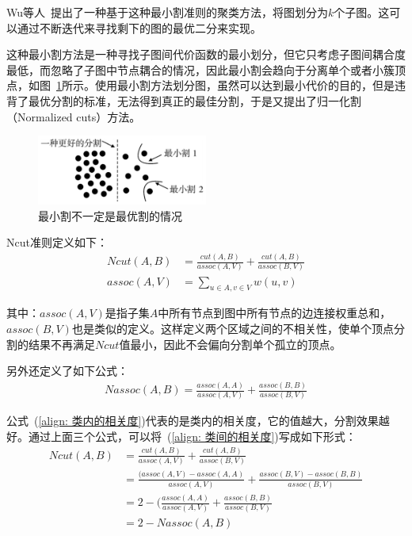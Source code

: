 \documentclass[12pt]{article}
\begin{document}
Wu等人~\cite{wu1993optimal}提出了一种基于这种最小割准则的聚类方法，将图划分为$k$个子图。这可以通过不断迭代来寻找剩下的图的最优二分来实现。

这种最小割方法是一种寻找子图间代价函数的最小划分，但它只考虑子图间耦合度最低，而忽略了子图中节点耦合的情况，因此最小割会趋向于分离单个或者小簇顶点，如图~\ref{fig: minCuts}所示。使用最小割方法划分图，虽然可以达到最小代价的目的，但是违背了最优分割的标准，无法得到真正的最佳分割，于是又提出了归一化割（Normalized cuts）方法。

\begin{figure}[!ht]
\centering
\includegraphics[width=0.5\textwidth]{minCuts.png}
\caption{最小割不一定是最优割的情况}
\label{fig: minCuts}
\end{figure} 

Ncut准则定义如下：
\begin{align}
\label{align: 类间的相关度}
Ncut(A, B) & = \frac{cut(A, B)}{assoc(A, V)} + \frac{cut(A, B)}{assoc(B, V)}\\
assoc(A, V) & = \sum_{u \in A, v \in V} w(u, v)
\end{align}

其中：$assoc(A, V)$是指子集$A$中所有节点到图中所有节点的边连接权重总和，$assoc(B, V)$也是类似的定义。这样定义两个区域之间的不相关性，使单个顶点分割的结果不再满足$Ncut$值最小，因此不会偏向分割单个孤立的顶点。

另外还定义了如下公式：
\begin{align}
\label{align: 类内的相关度}
Nassoc(A, B) = \frac{assoc(A, A)}{assoc(A, V)} + \frac{assoc(B, B)}{assoc(B, V)}
\end{align}

公式~(\ref{align: 类内的相关度})代表的是类内的相关度，它的值越大，分割效果越好。通过上面三个公式，可以将~(\ref{align: 类间的相关度})写成如下形式：
\begin{align}
\label{align: 类间类内}
Ncut(A, B) & = \frac{cut(A, B)}{assoc(A, V)} + \frac{cut(A, B)}{assoc(B, V)} \nonumber \\
          & = \frac{(assoc(A, V)-assoc(A, A)}{assoc(A, V)}+\frac{assoc(B, V)-assoc(B, B)}{assoc(B, V)} \nonumber \\
          & = 2 - (\frac{assoc(A, A)}{assoc(A, V)}+\frac{assoc(B, B)}{assoc(B,V)} \nonumber \\
          & = 2-Nassoc(A, B)
\end{align}
\end{document}
